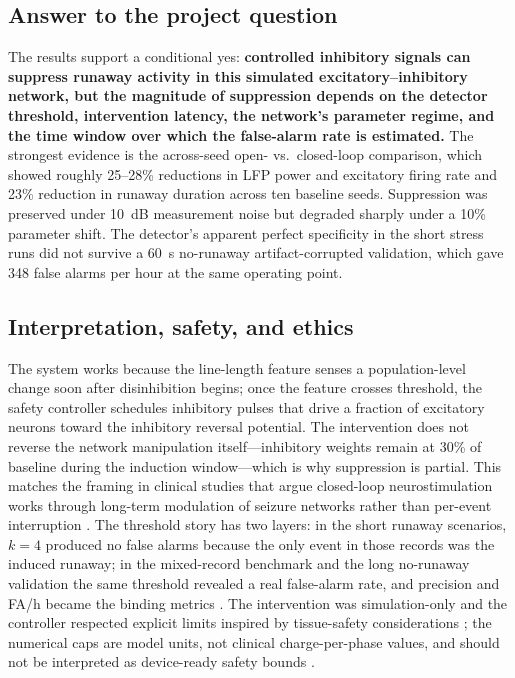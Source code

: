 \documentclass[12pt]{article}
\begin{document}
\subsection{Answer to the project question}
The results support a conditional yes: \textbf{controlled inhibitory signals can suppress runaway activity in this simulated excitatory--inhibitory network, but the magnitude of suppression depends on the detector threshold, intervention latency, the network's parameter regime, and the time window over which the false-alarm rate is estimated.} The strongest evidence is the across-seed open- vs.\ closed-loop comparison, which showed roughly 25--28\% reductions in LFP power and excitatory firing rate and 23\% reduction in runaway duration across ten baseline seeds. Suppression was preserved under 10~dB measurement noise but degraded sharply under a 10\% parameter shift. The detector's apparent perfect specificity in the short stress runs did not survive a 60~s no-runaway artifact-corrupted validation, which gave 348 false alarms per hour at the same operating point.

\subsection{Interpretation, safety, and ethics}
The system works because the line-length feature senses a population-level change soon after disinhibition begins; once the feature crosses threshold, the safety controller schedules inhibitory pulses that drive a fraction of excitatory neurons toward the inhibitory reversal potential. The intervention does not reverse the network manipulation itself---inhibitory weights remain at 30\% of baseline during the induction window---which is why suppression is partial. This matches the framing in clinical studies that argue closed-loop neurostimulation works through long-term modulation of seizure networks rather than per-event interruption \cite{sisterson2020,kokkinos2019,nair2020}. The threshold story has two layers: in the short runaway scenarios, \(k=4\) produced no false alarms because the only event in those records was the induced runaway; in the mixed-record benchmark and the long no-runaway validation the same threshold revealed a real false-alarm rate, and precision and FA/h became the binding metrics \cite{esteller2001,guo2010,dumpelmann2019,kassiri2024}. The intervention was simulation-only and the controller respected explicit limits inspired by tissue-safety considerations \cite{shannon1992,mccreery1990}; the numerical caps are model units, not clinical charge-per-phase values, and should not be interpreted as device-ready safety bounds \cite{kassiri2024}.
\end{document}
